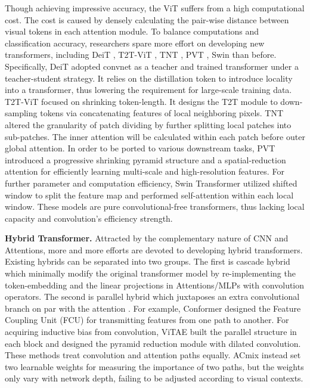 \documentclass[lettersize,journal]{IEEEtran}
\begin{document}
Though achieving impressive accuracy, the ViT \cite{dosovitskiy2021an} suffers from a high computational cost. The cost is caused by densely calculating the pair-wise distance between visual tokens in each attention module. To balance computations and classification accuracy, researchers spare more effort on developing new transformers, including DeiT \cite{Touvron2021TrainingDI}, T2T-ViT \cite{yuan2021tokens}, TNT \cite{tnt}, PVT \cite{wang2021pyramid}, Swin \cite{liu2021Swin} than before. Specifically, DeiT \cite{Touvron2021TrainingDI} adopted convnet as a teacher and trained transformer under a teacher-student strategy. It relies on the distillation token to introduce locality into a transformer, thus lowering the requirement for large-scale training data.
T2T-ViT \cite{yuan2021tokens} focused on shrinking token-length. It designs the T2T module to down-sampling tokens via concatenating features of local neighboring pixels.
TNT~\cite{tnt} altered the granularity of patch dividing by further splitting local patches into sub-patches. The inner attention will be calculated within each patch before outer global attention.
In order to be ported to various downstream tasks, PVT~\cite{wang2021pyramid} introduced a progressive shrinking pyramid structure and a spatial-reduction attention for efficiently learning multi-scale and high-resolution features.
For further parameter and computation efficiency, Swin Transformer \cite{liu2021Swin} utilized shifted window to split the feature map and performed self-attention within each local window. 
These models are pure convolutional-free transformers, thus lacking local capacity and convolution's efficiency strength.


\textbf{Hybrid Transformer.} Attracted by the complementary nature of CNN and Attentions, more and more efforts are devoted to developing hybrid transformers. Existing hybrids can be separated into two groups.
The first is cascade hybrid which minimally modify the original transformer model by re-implementing the token-embedding \cite{Chen2021VisformerTV,Hassani2021EscapingTB,Mehta2021MobileViTLG,Wu2021CvTIC,Yan2021ConTNetWN,Yang2021FocalSF,Yuan2021IncorporatingCD} and the linear projections \cite{Chen2021VisformerTV,He2021PruningSI,Mehta2021MobileViTLG,Wu2021CvTIC,Yan2021ConTNetWN,Yuan2021IncorporatingCD} in Attentions/MLPs with convolution operators.
The second is parallel hybrid which juxtaposes an extra convolutional branch on par with the attention \cite{Chen2021MobileFormerBM,Pan2021OnTI,Peng2021ConformerLF,Xu2021ViTAEVT}. For example, Conformer \cite{Peng2021ConformerLF} designed the Feature Coupling Unit (FCU) for transmitting features from one path to another. For acquiring inductive bias from convolution, ViTAE \cite{Xu2021ViTAEVT} built the parallel structure in each block and designed the pyramid reduction module with dilated convolution. These methods treat convolution and attention paths equally. 
ACmix \cite{Pan2021OnTI} instead set two learnable weights for measuring the importance of two paths, but the weights only vary with network depth, failing to be adjusted according to visual contexts.
\end{document}
